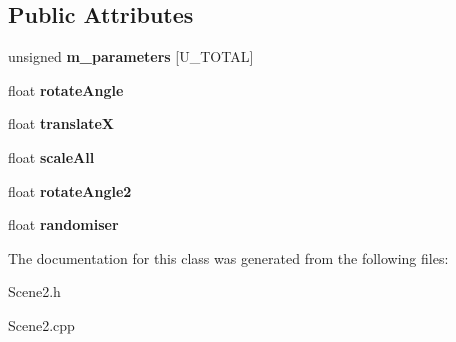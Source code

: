 \subsection*{Public Attributes}
\begin{DoxyCompactItemize}
\item 
\hypertarget{class_scene2_a91fa51259776242875a07ed6dba78bd0}{unsigned {\bfseries m\+\_\+parameters} \mbox{[}U\+\_\+\+T\+O\+T\+A\+L\mbox{]}}\label{class_scene2_a91fa51259776242875a07ed6dba78bd0}

\item 
\hypertarget{class_scene2_af1e450d21db6d3ea63232aea222681df}{float {\bfseries rotate\+Angle}}\label{class_scene2_af1e450d21db6d3ea63232aea222681df}

\item 
\hypertarget{class_scene2_a08edb88515cde967432df36ade24bc6f}{float {\bfseries translate\+X}}\label{class_scene2_a08edb88515cde967432df36ade24bc6f}

\item 
\hypertarget{class_scene2_a26b9f96854b0b2ae955b2d85dccf0341}{float {\bfseries scale\+All}}\label{class_scene2_a26b9f96854b0b2ae955b2d85dccf0341}

\item 
\hypertarget{class_scene2_a924b2a2e5ac0c951dea8bec7b52f6f2e}{float {\bfseries rotate\+Angle2}}\label{class_scene2_a924b2a2e5ac0c951dea8bec7b52f6f2e}

\item 
\hypertarget{class_scene2_ace313221ca13f71cb90ff42006ff9051}{float {\bfseries randomiser}}\label{class_scene2_ace313221ca13f71cb90ff42006ff9051}

\end{DoxyCompactItemize}


The documentation for this class was generated from the following files\+:\begin{DoxyCompactItemize}
\item 
Scene2.\+h\item 
Scene2.\+cpp\end{DoxyCompactItemize}
